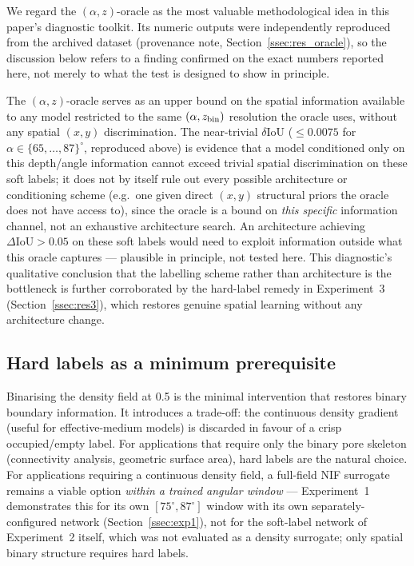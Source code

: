 \documentclass[aip,amsmath,amssymb,reprint]{revtex4-1}
\renewcommand{\ang}{\ensuremath{\alpha}} %
\newcommand{\iou}{\ensuremath{\mathrm{IoU}}}
\begin{document}
We regard the $(\alpha,z)$-oracle as the most valuable methodological
idea in this paper's diagnostic toolkit. Its numeric outputs were
independently reproduced from the archived dataset
(provenance note, Section~\ref{ssec:res_oracle}), so the discussion
below refers to a finding confirmed on the exact numbers reported
here, not merely to what the test is designed to show in principle.

The $(\alpha,z)$-oracle serves as an upper bound on the
spatial information available to any model restricted to the same
$(\alpha, z_{\rm bin})$ resolution the oracle uses, without any
spatial $(x,y)$ discrimination.
The near-trivial $\delta\iou$ ($\leq 0.0075$ for $\ang \in
\{65,\ldots,87\}^{\circ}$, reproduced above) is evidence that a
model conditioned only on this depth/angle information cannot
exceed trivial spatial discrimination on these soft labels; it does
not by itself rule out every possible architecture or conditioning
scheme (e.g.\ one given direct $(x,y)$ structural priors the oracle
does not have access to), since the oracle is a bound on
\emph{this specific} information channel, not an exhaustive
architecture search.
An architecture achieving $\Delta\iou > 0.05$ on these soft labels
would need to exploit information outside what this oracle
captures — plausible in principle, not tested here.
This diagnostic's qualitative conclusion that the labelling scheme rather than
architecture is the bottleneck is further corroborated by the hard-label
remedy in Experiment~3 (Section~\ref{ssec:res3}), which restores
genuine spatial learning without any architecture change.

\subsection{Hard labels as a minimum prerequisite}
\label{ssec:disc_hardlabel}

Binarising the density field at 0.5 is the minimal intervention
that restores binary boundary information.  It introduces a
trade-off: the continuous density gradient (useful for effective-medium
models) is discarded in favour of a crisp occupied/empty label.
For applications that require only the binary pore skeleton
(connectivity analysis, geometric surface area), hard labels are
the natural choice.
For applications requiring a continuous density field, a
full-field NIF surrogate remains a viable option \emph{within a
trained angular window} — Experiment~1 demonstrates this for its
own $[75^{\circ},87^{\circ}]$ window with its own separately-configured network
(Section~\ref{ssec:exp1}), not for the soft-label network of
Experiment~2 itself, which was not evaluated as a density
surrogate; only spatial binary structure requires hard labels.
\end{document}
